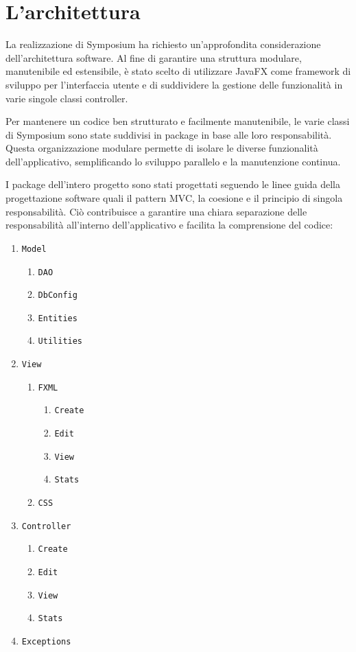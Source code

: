 \section{L'architettura}
La realizzazione di Symposium ha richiesto un'approfondita considerazione dell'architettura software. Al fine di garantire una struttura modulare, manutenibile ed estensibile, è stato scelto di utilizzare JavaFX come framework di sviluppo per l'interfaccia utente e di suddividere la gestione delle funzionalità in varie singole classi controller. 
\bigskip

Per mantenere un codice ben strutturato e facilmente manutenibile, le varie classi di Symposium sono state suddivisi in package in base alle loro responsabilità. Questa organizzazione modulare permette di isolare le diverse funzionalità dell'applicativo, semplificando lo sviluppo parallelo e la manutenzione continua. 
\bigskip

I package dell'intero progetto sono stati progettati seguendo le linee guida della progettazione software quali il pattern MVC, la coesione e il principio di singola responsabilità. Ciò contribuisce a garantire una chiara separazione delle responsabilità all'interno dell'applicativo e facilita la comprensione del codice:
\begin{enumerate}
	\item \texttt{Model}
	\begin{enumerate}
		\item \texttt{DAO}
		\item \texttt{DbConfig}
		\item \texttt{Entities}
		\item \texttt{Utilities}
	\end{enumerate}
	\item \texttt{View}
	\begin{enumerate}
		\item \texttt{FXML}
		\begin{enumerate}
			\item \texttt{Create}
			\item \texttt{Edit}
			\item \texttt{View}
			\item \texttt{Stats}
		\end{enumerate}
		\item \texttt{CSS}
	\end{enumerate}
	\item \texttt{Controller}
	\begin{enumerate}
		\item \texttt{Create}
		\item \texttt{Edit}
		\item \texttt{View}
		\item \texttt{Stats}
	\end{enumerate}
	\item \texttt{Exceptions}
\end{enumerate}

